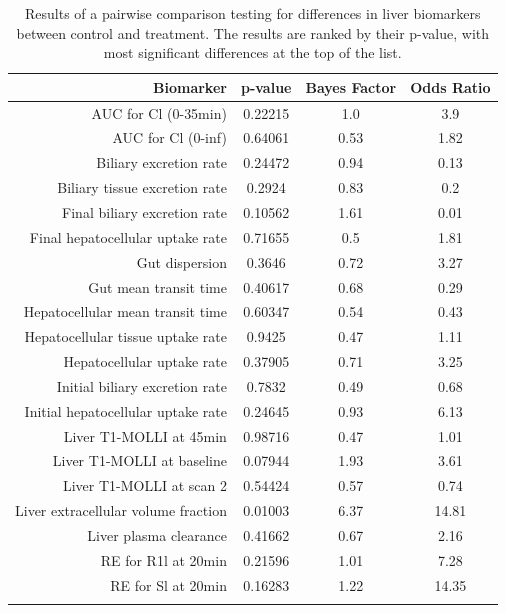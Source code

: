 \documentclass{epflreport}%
\begin{document}
%
\begin{longtable}{rccc}%
\hline%
Biomarker&p{-}value&Bayes Factor&Odds Ratio\\%
\hline%
AUC for Cl (0{-}35min)&0.22215&1.0&3.9\\%
AUC for Cl (0{-}inf)&0.64061&0.53&1.82\\%
Biliary excretion rate&0.24472&0.94&0.13\\%
Biliary tissue excretion rate&0.2924&0.83&0.2\\%
Final biliary excretion rate&0.10562&1.61&0.01\\%
Final hepatocellular uptake rate&0.71655&0.5&1.81\\%
Gut dispersion&0.3646&0.72&3.27\\%
Gut mean transit time&0.40617&0.68&0.29\\%
Hepatocellular mean transit time&0.60347&0.54&0.43\\%
Hepatocellular tissue uptake rate&0.9425&0.47&1.11\\%
Hepatocellular uptake rate&0.37905&0.71&3.25\\%
Initial biliary excretion rate&0.7832&0.49&0.68\\%
Initial hepatocellular uptake rate&0.24645&0.93&6.13\\%
Liver T1{-}MOLLI at 45min&0.98716&0.47&1.01\\%
Liver T1{-}MOLLI at baseline&0.07944&1.93&3.61\\%
Liver T1{-}MOLLI at scan 2&0.54424&0.57&0.74\\%
Liver extracellular volume fraction&0.01003&6.37&14.81\\%
Liver plasma clearance&0.41662&0.67&2.16\\%
RE for R1l at 20min&0.21596&1.01&7.28\\%
RE for Sl at 20min&0.16283&1.22&14.35\\%
\hline%
\caption{Results of a pairwise comparison testing for differences in liver biomarkers between control and treatment. The results are ranked by their p-value, with most significant differences at the top of the list.} \\%
\end{longtable}%
\end{document}
